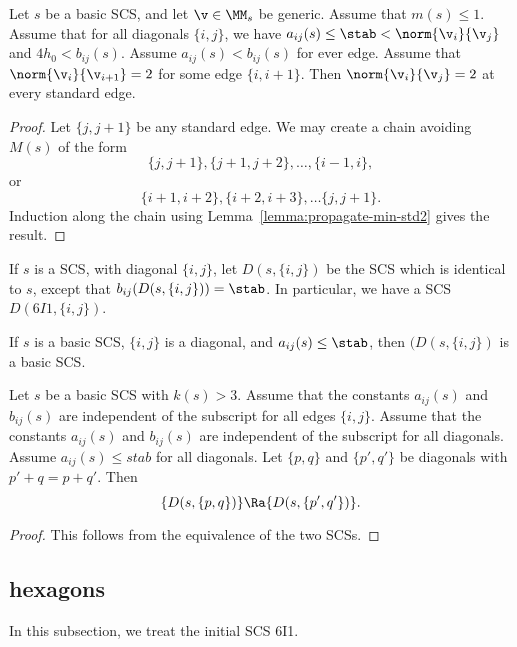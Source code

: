 \begin{lemma}\label{lemma:propagate-min-std3}
Let $s$ be a basic SCS, and let $\v\in \MM_s$ be generic.   Assume that $m(s)\le 1$.  
Assume that
for all diagonals $\{i,j\}$, we have
$a_{ij}(s)\le \stab < \norm{\v_i}{\v_j}$ and $4h_0 < b_{ij}(s)$.
Assume $a_{ij}(s) < b_{ij}(s)$ for ever edge.
Assume that $\norm{\v_i}{\v_{i+1}}=2$ for some edge $\{i,i+1\}$.  
Then $\norm{\v_i}{\v_j}=2$ at every standard edge.
\end{lemma}

\begin{proof}  Let $\{j,j+1\}$ be any standard edge.  We may create a chain avoiding $M(s)$ of the form
\[
\{j,j+1\}, \{j+1,j+2\},\ldots, \{i-1,i\},
\]
or 
\[
\{i+1,i+2\}, \{i+2,i+3\},\ldots \{j,j+1\}.
\]
Induction along the chain using Lemma~\ref{lemma:propagate-min-std2} gives the result.
\end{proof}


If $s$ is a SCS,
with  diagonal $\{i,j\}$, let $D(s,\{i,j\})$ be the SCS which is identical to $s$, except that
$b_{ij}(D(s,\{i,j\})) =\stab$.   In particular, we have a SCS $D(6I1,\{i,j\})$.

\begin{lemma}
If $s$ is a basic SCS, $\{i,j\}$ is a diagonal, and
$a_{ij}(s)\le\stab$, then $(D(s,\{i,j\})$ is a basic SCS.
\end{lemma}


\begin{lemma}\label{lemma:equivalent-diagonal}
Let $s$ be a basic SCS with $k(s)>3$.  
Assume that the constants $a_{ij}(s)$ and $b_{ij}(s)$ are independent of
the subscript for all edges $\{i,j\}$.  Assume that the constants
$a_{ij}(s)$ and $b_{ij}(s)$ are independent of the subscript for all diagonals.
Assume $a_{ij}(s)\le stab$ for all diagonals.
Let $\{p,q\}$ and $\{p',q'\}$ be diagonals with $p'+q = p+q'$.
Then
\[
\{D(s,\{p,q\})\} \Ra \{D(s,\{p',q'\})\}.
\]
\end{lemma}

\begin{proof}  This follows from the equivalence of the two SCSs.
\end{proof}

\subsection{hexagons}

In this subsection, we treat the initial SCS 6I1.




